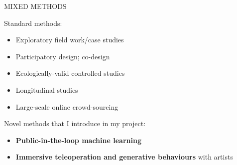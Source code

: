 \documentclass[xcolor=table]{beamer}
\begin{document}
%
%
%
%
%
%
%


\begin{frame}{MIXED METHODS}

    Standard methods:
    \begin{itemize}
        \item Exploratory field work/case studies
        \item Participatory design; co-design
        \item Ecologically-valid controlled studies
        \item Longitudinal studies
        \item Large-scale online crowd-sourcing
    \end{itemize}

    Novel methods that I introduce in my project:
    \begin{itemize}
        \item \textbf{Public-in-the-loop machine learning}
        \item \textbf{Immersive teleoperation and generative behaviours} with artists
    \end{itemize}

\end{frame}
\end{document}
